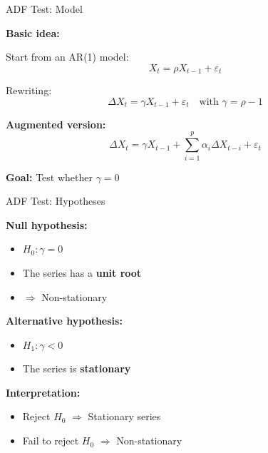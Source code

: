 \documentclass[aspectratio=169]{beamer}
\begin{document}
\begin{frame}{ADF Test: Model}

\textbf{Basic idea:}

\vspace{0.3cm}

Start from an AR(1) model:
\[
X_t = \rho X_{t-1} + \varepsilon_t
\]

\vspace{0.3cm}

Rewriting:
\[
\Delta X_t = \gamma X_{t-1} + \varepsilon_t
\quad \text{with } \gamma = \rho - 1
\]

\vspace{0.4cm}

\textbf{Augmented version:}
\[
\Delta X_t = \gamma X_{t-1} + \sum_{i=1}^{p} \alpha_i \Delta X_{t-i} + \varepsilon_t
\]

\vspace{0.3cm}

\textbf{Goal:} Test whether $\gamma = 0$

\end{frame}

\begin{frame}{ADF Test: Hypotheses}

\textbf{Null hypothesis:}
\begin{itemize}
    \item $H_0: \gamma = 0$
    \item The series has a \textbf{unit root}
    \item $\Rightarrow$ Non-stationary
\end{itemize}

\vspace{0.4cm}

\textbf{Alternative hypothesis:}
\begin{itemize}
    \item $H_1: \gamma < 0$
    \item The series is \textbf{stationary}
\end{itemize}

\vspace{0.4cm}

\textbf{Interpretation:}
\begin{itemize}
    \item Reject $H_0$ $\Rightarrow$ Stationary series
    \item Fail to reject $H_0$ $\Rightarrow$ Non-stationary
\end{itemize}

\end{frame}
\end{document}
